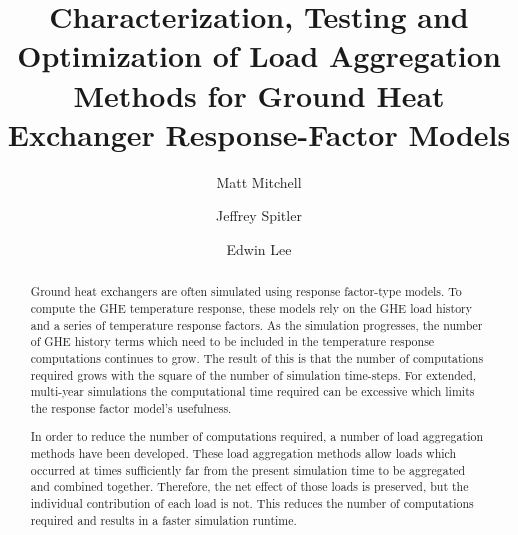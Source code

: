 \documentclass[review,12pt]{elsarticle}
\begin{document}
\begin{frontmatter}


\title{Characterization, Testing and Optimization of Load Aggregation Methods for Ground Heat Exchanger Response-Factor Models}




\author[label1]{Matt Mitchell}
\author[label1]{Jeffrey Spitler}
\author[label2]{Edwin Lee}

\address[label1]{Oklahoma State University, Stillwater OK.}
\address[label2]{National Renewable Energy Laboratory, Golden CO.}


\begin{abstract}
Ground heat exchangers are often simulated using response factor-type models. To compute the GHE temperature response, these models rely on the GHE load history and a series of temperature response factors. As the simulation progresses, the number of GHE history terms which need to be included in the temperature response computations continues to grow. The result of this is that the number of computations required grows with the square of the number of simulation time-steps. For extended, multi-year simulations the computational time required can be excessive which limits the response factor model's usefulness.

In order to reduce the number of computations required, a number of load aggregation methods have been developed. These load aggregation methods allow loads which occurred at times sufficiently far from the present simulation time to be aggregated and combined together. Therefore, the net effect of those loads is preserved, but the individual contribution of each load is not. This reduces the number of computations required and results in a faster simulation runtime.


\end{abstract}
\end{frontmatter}
\end{document}
